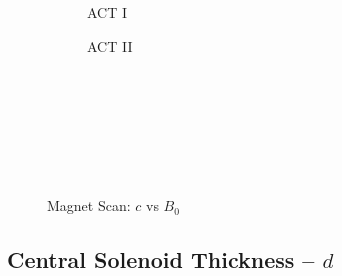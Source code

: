 \begin{figure*}[h!]
\begin{subfigure}[t]{0.45\textwidth}
\begin{adjustbox}{width=\textwidth}
      \Large
      
    \end{adjustbox}
        \caption{ACT I}
    \end{subfigure}
    \hfill
    \begin{subfigure}[t]{0.45\textwidth}
        \centering
    \begin{adjustbox}{width=\textwidth}
      \Large
      
    \end{adjustbox}
        \caption{ACT II}
    \end{subfigure}
    \hfill \hfill ~\\ ~\\ ~\\ ~\\
  \caption[]{Magnet Scan: $c$ vs $B_0$} ~\\
\end{figure*}


\clearpage

\newpage

\subsection*{ Central Solenoid Thickness -- $d$ }
  \label{subsection:scan_d}

